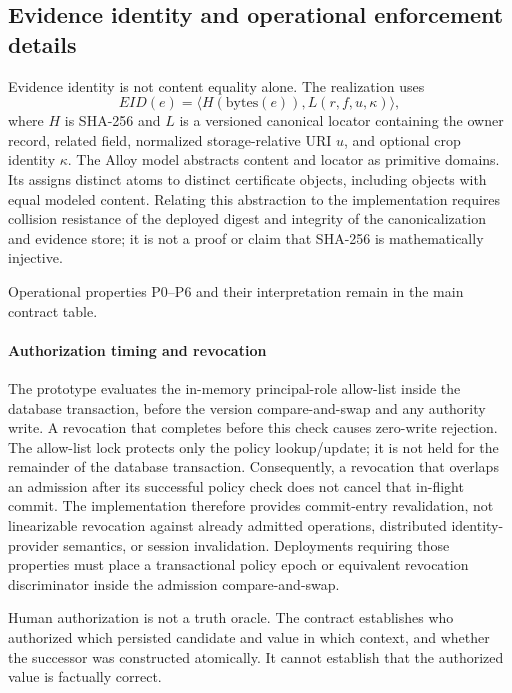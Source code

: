 \subsection{Evidence identity and operational enforcement details}
Evidence identity is not content equality alone. The realization uses
\begin{equation}
EID(e)=\langle H(\mathrm{bytes}(e)),L(r,f,u,\kappa)\rangle,
\label{eq:evidence}
\end{equation}
where $H$ is SHA-256 and $L$ is a versioned canonical locator containing the owner record, related field, normalized storage-relative URI $u$, and optional crop identity $\kappa$. The Alloy model abstracts content and locator as primitive domains. Its  assigns distinct  atoms to distinct certificate objects, including objects with equal modeled content. Relating this abstraction to the implementation requires collision resistance of the deployed digest and integrity of the canonicalization and evidence store; it is not a proof or claim that SHA-256 is mathematically injective.

Operational properties P0--P6 and their interpretation remain in the main contract table.

\paragraph{Authorization timing and revocation}
\label{app:authorization-timing}
The prototype evaluates the in-memory principal-role allow-list inside the database transaction, before the version compare-and-swap and any authority write. A revocation that completes before this check causes zero-write rejection. The allow-list lock protects only the policy lookup/update; it is not held for the remainder of the database transaction. Consequently, a revocation that overlaps an admission after its successful policy check does not cancel that in-flight commit. The implementation therefore provides commit-entry revalidation, not linearizable revocation against already admitted operations, distributed identity-provider semantics, or session invalidation. Deployments requiring those properties must place a transactional policy epoch or equivalent revocation discriminator inside the admission compare-and-swap.

Human authorization is not a truth oracle. The contract establishes who authorized which persisted candidate and value in which context, and whether the successor was constructed atomically. It cannot establish that the authorized value is factually correct.




